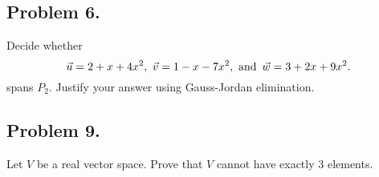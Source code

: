 \newpage

\subsection*{Problem 6.}
Decide whether
\[
  \vec{u} = 2 + x + 4x^2,~\vec{v} = 1 - x - 7x^2, \operatorname{~\text{and}~} \vec{w} = 3 + 2x + 9x^2.
\]
spans $P_2$. Justify your answer using Gauss-Jordan elimination.

\newpage

\subsection*{Problem 9.}
Let $V$ be a real vector space. Prove that $V$ cannot have exactly 3 elements.

\newpage

